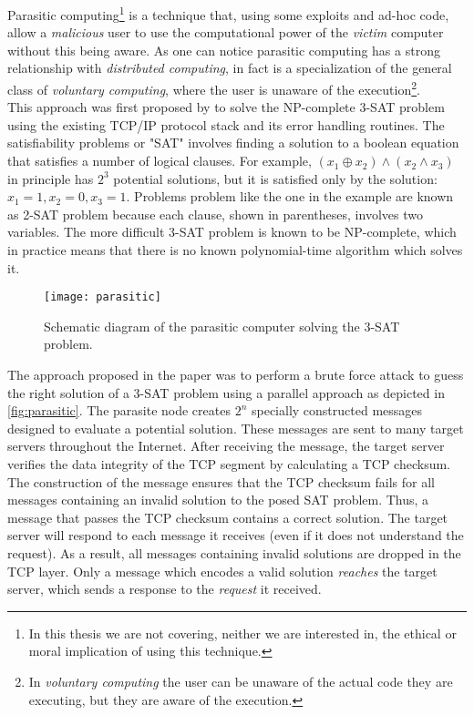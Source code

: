 Parasitic computing\footnote{In this thesis we are not covering, neither
we are interested in, the ethical or moral implication of using this technique.}
is a technique that, using some exploits and ad-hoc code, allow a \emph{malicious}
user to use the computational power of the \emph{victim} computer without this
being aware. As one can notice parasitic computing has a strong relationship
with \emph{distributed computing}, in fact is a specialization of the general
class of \emph{voluntary computing}, where the user is unaware of
the execution\footnote{In \emph{voluntary computing} the user can be unaware
of the actual code they are executing, but they are aware of the execution.}.\\

This approach was first proposed by \cite{barabasi2001parasitic} to solve the
NP-complete 3-SAT problem using the existing TCP/IP protocol stack and its error
handling routines. The satisfiability problems or "SAT" involves finding a
solution to a boolean equation that satisfies a number of logical clauses. For
example, $(x_1 \oplus x_2) \land (x_2 \land x_3 )$ in principle has $2^3$ potential
solutions, but it is satisfied only by the solution: $x_1=1, x_2=0, x_3=1$.
Problems problem like the one in the example are known as 2-SAT problem because
each clause, shown in parentheses, involves two variables. The more difficult
3-SAT problem is known to be NP-complete, which in practice means that there is
no known polynomial-time algorithm which solves it.\\
\begin{figure}[htb]
    \centering
    \texttt{[image: parasitic]}
    \caption{Schematic diagram of the parasitic computer solving the 3-SAT
    problem.}
    \label{fig:parasitic}
\end{figure}

The approach proposed in the paper was to perform a brute force attack to guess
the right solution of a 3-SAT problem using a parallel approach as depicted in
\autoref{fig:parasitic}. The parasite node creates $2^n$ specially constructed
messages designed to evaluate a potential solution. These messages are sent to
many target servers throughout the Internet. After receiving the message, the
target server verifies the data integrity of the TCP segment by calculating a
TCP checksum. The construction of the message ensures that the TCP checksum fails
for all messages containing an invalid solution to the posed SAT problem. Thus,
a message that passes the TCP checksum contains a correct solution. The target
server will respond to each message it receives (even if it does not understand
the request). As a result, all messages containing invalid solutions are dropped
in the TCP layer. Only a message which encodes a valid solution \emph{reaches}
the target server, which sends a response to the \emph{request} it received.\\


